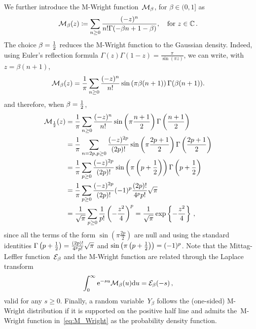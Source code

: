 We further introduce the $\mathrm{M}$-Wright function~$\mathcal{M}_{\beta}$, for $\beta\in(0, 1]$ as
\begin{equation}\label{eq:M_Wright}
\mathcal{M}_{\beta}(z) \coloneqq 
\sum_{n\geq 0} \frac{(-z)^n}{n ! \Gamma(-\beta n+1-\beta)}, \quad\text{for }z \in \mathbb{C}\,.
\end{equation}
The choice $\beta=\frac{1}{2}$ reduces the M-Wright function to the Gaussian density.
Indeed, using Euler's reflection formula
$\Gamma(z)\Gamma(1-z) = \frac{\pi}{\sin(\pi z)}$, we can write, with~${z=\beta(n+1)}$,
$$
\mathcal{M}_{\beta}(z)
 = \frac{1}{\pi}\sum_{n\geq 0} \frac{(-z)^n}{n!}
\sin\left(\pi\beta(n+1)\right)\Gamma(\beta(n+1)).
$$
and therefore, when $\beta=\frac{1}{2}$,
\begin{align*}
\mathcal{M}_{\frac{1}{2}}(z)
 & = \frac{1}{\pi}\sum_{n\geq 0} \frac{(-z)^n}{n!}
\sin\left(\pi\frac{n+1}{2}\right)\Gamma\left(\frac{n+1}{2}\right)\\
 & = \frac{1}{\pi}\sum_{n=2p, p\geq 0} \frac{(-z)^{2p}}{(2p)!}
\sin\left(\pi\frac{2p+1}{2}\right)\Gamma\left(\frac{2p+1}{2}\right)\\
 & = \frac{1}{\pi}\sum_{p\geq 0} \frac{(-z)^{2p}}{(2p)!}
\sin\left(\pi\left(p+\frac{1}{2}\right)\right)\Gamma\left(p+\frac{1}{2}\right)\\
 & = \frac{1}{\pi}\sum_{p\geq 0} \frac{(-z)^{2p}}{(2p)!}
(-1)^{p}\frac{(2p)!}{4^p p!}\sqrt{\pi}\\
 & = \frac{1}{\sqrt{\pi}}\sum_{p\geq 0} 
 \frac{1}{p!}\left(-\frac{z^2}{4}\right)^{p}
  = \frac{1}{\sqrt{\pi}}\exp\left\{-\frac{z^2}{4}\right\}\,,
\end{align*}
since all the terms of the form $\sin\left(\pi\frac{2p}{2}\right)$ are null and using 
the standard identities $\Gamma\left(p+\frac{1}{2}\right) = \frac{(2p)!}{4^p p!}\sqrt{\pi}$ and $\sin\left(\pi\left(p+\frac{1}{2}\right)\right) = (-1)^{p}$.
Note that the Mittag-Leffler function~$\mathcal{E}_{\beta}$ and the M-Wright function are related through the Laplace transform
\begin{equation}\label{eq:LaplaceM-Wright}
\int_0^{\infty} \mathrm{e}^{-s u} \mathcal{M}_{\beta}(u) \mathrm{d} u
= \mathcal{E}_{\beta}(-s)\,,
\end{equation}
valid for any $s\geq 0$. Finally, a random variable~$Y_\beta$ follows the (one-sided) $\mathrm{M}$-Wright distribution
if it is supported on the positive half line
and admits the~M-Wright function in~\eqref{eq:M_Wright}
as the probability density function.
